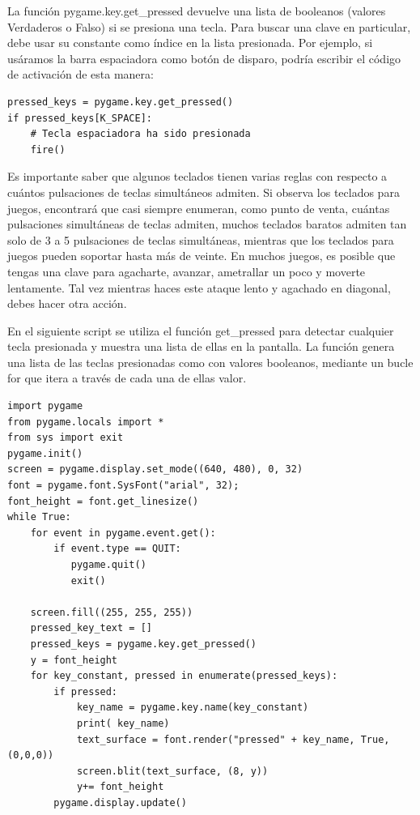 {La función {\ttfamily pygame.key.get\_pressed} devuelve una lista
de booleanos (valores Verdaderos o Falso) si se presiona una tecla.  Para buscar una clave en particular, debe usar su constante como índice en la lista presionada. Por ejemplo, si usáramos la barra espaciadora como botón de disparo,
podría escribir el código de activación de esta manera:
\begin{lstlisting}
pressed_keys = pygame.key.get_pressed()
if pressed_keys[K_SPACE]:
    # Tecla espaciadora ha sido presionada
    fire()
\end{lstlisting}
Es importante saber que algunos teclados tienen varias reglas con respecto a cuántos pulsaciones de teclas simultáneos
admiten. Si observa los teclados para juegos, encontrará que casi siempre enumeran, como punto de venta, cuántas 
pulsaciones simultáneas de teclas admiten, muchos teclados baratos admiten tan solo
de 3 a 5 pulsaciones de teclas simultáneas, mientras que los teclados para juegos pueden soportar hasta más de veinte.
En muchos juegos, es posible que tengas una clave para agacharte, avanzar, ametrallar un poco y moverte lentamente. Tal vez
mientras haces este ataque lento y agachado en diagonal, debes hacer otra acción. 


En el siguiente script se utiliza el función {\ttfamily get\_pressed}  para detectar cualquier tecla presionada y
muestra una lista de ellas en la pantalla. La función genera una lista de las teclas presionadas como con valores booleanos,
mediante un bucle {\ttfamily for} que itera a través de cada una de ellas valor.  

\hspace{-2.4cm}{\ttfamily \scriptsize demo}

\vspace{-0.2cm}
\hspace{-2.3cm}{\ttfamily \scriptsize \_tecla.py}\vspace{-0.84cm}
\begin{lstlisting}
import pygame
from pygame.locals import *
from sys import exit
pygame.init()
screen = pygame.display.set_mode((640, 480), 0, 32)
font = pygame.font.SysFont("arial", 32);
font_height = font.get_linesize()
while True:
    for event in pygame.event.get():
        if event.type == QUIT:
           pygame.quit()
           exit()

    screen.fill((255, 255, 255))
    pressed_key_text = []
    pressed_keys = pygame.key.get_pressed()
    y = font_height
    for key_constant, pressed in enumerate(pressed_keys):
        if pressed:
            key_name = pygame.key.name(key_constant)
            print( key_name)
            text_surface = font.render("pressed" + key_name, True, (0,0,0))
            screen.blit(text_surface, (8, y))
            y+= font_height
        pygame.display.update()
\end{lstlisting}

}
